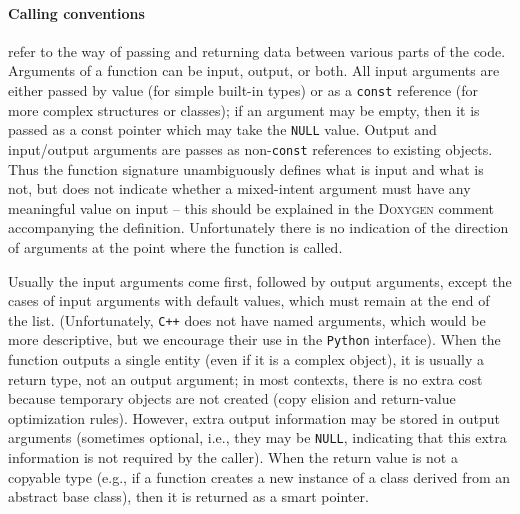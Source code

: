 \documentclass[12pt]{article}
\newcommand{\Cpp}  {\texttt{C++}\xspace}
\newcommand{\Python}{\texttt{Python}\xspace}
\let\oldparagraph\paragraph
\renewcommand{\paragraph}[1]{\vspace{-2mm}\oldparagraph{#1}}
\begin{document}
\paragraph{Calling conventions} \label{sec:CallingConventions}  refer to the way of passing and returning data between various parts of the code. Arguments of a function can be input, output, or both. All input arguments are either passed by value (for simple built-in types) or as a \texttt{const} reference (for more complex structures or classes); if an argument may be empty, then it is passed as a const pointer which may take the \texttt{NULL} value. Output and input/output arguments are passes as non-\texttt{const} references to existing objects. Thus the function signature unambiguously defines what is input and what is not, but does not indicate whether a mixed-intent argument must have any meaningful value on input -- this should be explained in the \textsc{Doxygen} comment accompanying the definition. Unfortunately there is no indication of the direction of arguments at the point where the function is called.

Usually the input arguments come first, followed by output arguments, except the cases of input arguments with default values, which must remain at the end of the list. (Unfortunately, \Cpp does not have named arguments, which would be more descriptive, but we encourage their use in the \Python interface).
When the function outputs a single entity (even if it is a complex object), it is usually a return type, not an output argument; in most contexts, there is no extra cost because temporary objects are not created (copy elision and return-value optimization rules). However, extra output information may be stored in output arguments (sometimes optional, i.e., they may be \texttt{NULL}, indicating that this extra information is not required by the caller). When the return value is not a copyable type (e.g., if a function creates a new instance of a class derived from an abstract base class), then it is returned as a smart pointer.
\end{document}

